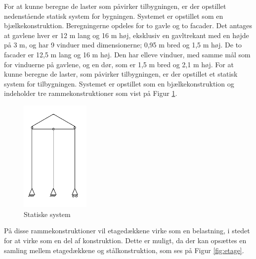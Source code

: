 For at kunne beregne de laster som påvirker tilbygningen, er der opstillet nedenstående statisk system for bygningen. Systemet er opstillet som en bjælkekonstruktion.
\newline
\newline
Beregningerne opdeles for to gavle og to facader. Det antages at gavlene hver er 12 m lang og 16 m høj, eksklusiv en gavltrekant med en højde på 3 m, og har 9 vinduer med dimensionerne; 0,95 m bred og 1,5 m høj.
\newline
\newline
De to facader er 12,5 m lang og 16 m høj. Den har elleve vinduer, med samme mål som for vinduerne på gavlene, og en dør, som er 1,5 m bred og 2,1 m høj.
\newline
\newline
For at kunne beregne de laster, som påvirker tilbygningen, er der opstillet et statisk system for tilbygningen. Systemet er opstillet som en bjælkekonstruktion og indeholder tre rammekonstruktioner som vist på Figur \ref{fig:system}.

\begin{figure}[htbp]
	\centering
	\includegraphics[width=0.3\textwidth]{billeder/del1statiskesystem.png}
	\caption{Statiske system}
	\label{fig:system}
\end{figure}

På disse rammekonstruktioner vil etagedækkene virke som en belastning, i stedet for at virke som en del af konstruktion. Dette er muligt, da der kan opsættes en samling mellem etagedækkene og stålkonstruktion, som ses på Figur \ref{fig:etage}.

